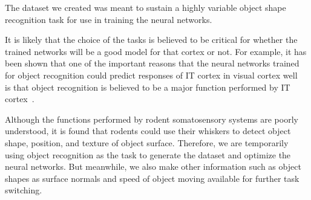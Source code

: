 The dataset we created was meant to sustain a highly variable object shape recognition task for use in training the neural networks.  

It is likely that the choice of the tasks is believed to be critical for whether the trained networks will be a good model for that cortex or not.
For example, it has been shown that one of the important reasons that the neural networks trained for object recognition could predict responses of IT cortex in visual cortex well~\cite{Yamins2014, cadieu2014deep} is that object recognition is believed to be a major function performed by IT cortex~\cite{hung2005fast, yamins2016using}. 

Although the functions performed by rodent somatosensory systems are poorly understood, it is found that rodents could use their whiskers to detect object shape, position, and texture of object surface\cite{Boubenec2012,Diamond2008,Arabzadeh2005,OConnor2010}.
Therefore, we are temporarily using object recognition as the task to generate the dataset and optimize the neural networks. But meanwhile, we also make other information such as object shapes as surface normals and speed of object moving available for further task switching.